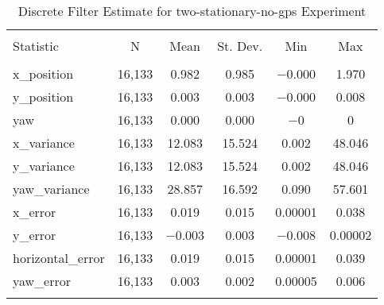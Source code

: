
\begin{table}[h] \centering 
  \caption{Discrete Filter Estimate for two-stationary-no-gps Experiment} 
  \label{tab:two_stationary_no_gps_discrete_summary} 
\begin{tabular}{@{\extracolsep{5pt}}lccccc} 
\\[-1.8ex]\hline 
\hline \\[-1.8ex] 
Statistic & \multicolumn{1}{c}{N} & \multicolumn{1}{c}{Mean} & \multicolumn{1}{c}{St. Dev.} & \multicolumn{1}{c}{Min} & \multicolumn{1}{c}{Max} \\ 
\hline \\[-1.8ex] 
x\_position & 16,133 & \num{0.982} & \num{0.985} & $-$0.000 & \num{1.970} \\ 
y\_position & 16,133 & \num{0.003} & \num{0.003} & $-$0.000 & \num{0.008} \\ 
yaw & 16,133 & \num{0.000} & \num{0.000} & $-$0 & 0 \\ 
x\_variance & 16,133 & \num{12.083} & \num{15.524} & \num{0.002} & \num{48.046} \\ 
y\_variance & 16,133 & \num{12.083} & \num{15.524} & \num{0.002} & \num{48.046} \\ 
yaw\_variance & 16,133 & \num{28.857} & \num{16.592} & \num{0.090} & \num{57.601} \\ 
x\_error & 16,133 & \num{0.019} & \num{0.015} & \num{0.00001} & \num{0.038} \\ 
y\_error & 16,133 & $-$0.003 & \num{0.003} & $-$0.008 & \num{0.00002} \\ 
horizontal\_error & 16,133 & \num{0.019} & \num{0.015} & \num{0.00001} & \num{0.039} \\ 
yaw\_error & 16,133 & \num{0.003} & \num{0.002} & \num{0.00005} & \num{0.006} \\ 
\hline \\[-1.8ex] 
\end{tabular} 
\end{table} 
